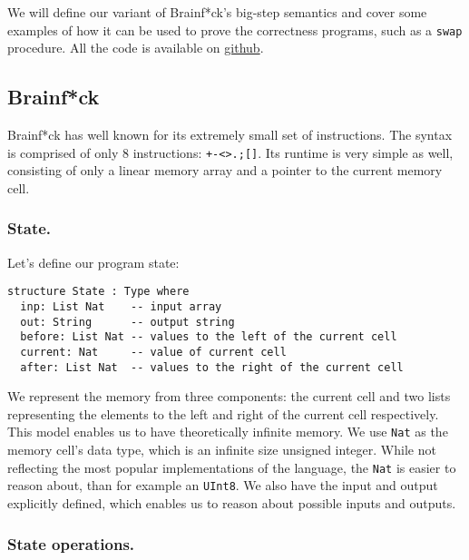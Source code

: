 \documentclass[runningheads]{llncs}
\newcommand{\cc}{\lstinline[mathescape]}
\begin{document}
We will define our variant of Brainf*ck's big-step semantics and cover some
examples of how it can be used to prove the correctness programs, such as a
\cc{swap} procedure. All the code is available on
\href{https://github.com/Stefan-Radu/master/tree/master/an2_DE_erasmus/logic_seminar/bf_operational_semantics}{github}.

\subsection{Brainf*ck}

Brainf*ck has well known for its extremely small set of instructions. The 
syntax is comprised of only 8 instructions: \cc{+-<>.;[]}. Its runtime is
very simple as well, consisting of only a linear memory array and a pointer
to the current memory cell.

\vspace{-3mm}

\subsubsection{State.} 

Let's define our program state:

\vspace{2mm}
\begin{lstlisting}[mathescape]
structure State : Type where
  inp: List Nat    -- input array
  out: String      -- output string
  before: List Nat -- values to the left of the current cell
  current: Nat     -- value of current cell
  after: List Nat  -- values to the right of the current cell
\end{lstlisting}

We represent the memory from three components: the current cell and two lists
representing the elements to the left and right of the current cell
respectively. This model enables us to have theoretically infinite memory. We
use \cc{Nat} as the memory cell's data type, which is an infinite size unsigned
integer. While not reflecting the most popular implementations of the language,
the \cc{Nat} is easier to reason about, than for example an \cc{UInt8}. We also
have the input and output explicitly defined, which enables us to reason about
possible inputs and outputs.

\subsubsection{State operations.} 
\end{document}
